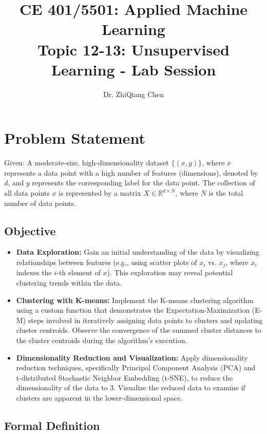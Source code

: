 \documentclass[12pt]{article}
\begin{document}
\doublespacing	

\title{CE 401/5501: Applied Machine Learning\\ \large Topic 12-13: Unsupervised Learning - Lab Session}
\author{Dr. ZhiQiang Chen}
\date{}
\maketitle

\section*{Problem Statement}

Given: A moderate-size, high-dimensionality dataset \(\{(x, y)\}\), where \(x\) represents a data point with a high number of features (dimensions), denoted by \(d\), and \(y\) represents the corresponding label for the data point. The collection of all data points \(x\) is represented by a matrix \(X \in \mathbb{R}^{d \times N}\), where \(N\) is the total number of data points.

\subsection*{Objective}
\begin{itemize}
    \item \textbf{Data Exploration:} Gain an initial understanding of the data by visualizing relationships between features (e.g., using scatter plots of \(x_i\) vs. \(x_j\), where \(x_i\) indexes the \(i\)-th element of \(x\)). This exploration may reveal potential clustering trends within the data.
    \item \textbf{Clustering with K-means:} Implement the K-means clustering algorithm using a custom function that demonstrates the Expectation-Maximization (E-M) steps involved in iteratively assigning data points to clusters and updating cluster centroids. Observe the convergence of the summed cluster distances to the cluster centroids during the algorithm's execution.
    \item \textbf{Dimensionality Reduction and Visualization:} Apply dimensionality reduction techniques, specifically Principal Component Analysis (PCA) and t-distributed Stochastic Neighbor Embedding (t-SNE), to reduce the dimensionality of the data to 3. Visualize the reduced data to examine if clusters are apparent in the lower-dimensional space.
\end{itemize}

\subsection*{Formal Definition}
\end{document}
